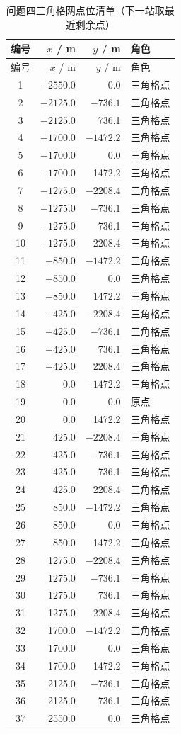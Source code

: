 \documentclass{cumcmthesis}
\begin{document}
{\scriptsize
\begin{longtable}{crrl}
\caption{问题四三角格网点位清单（下一站取最近剩余点）}
\label{tab:q4visit}\\
\toprule
编号 & $x$ / m & $y$ / m & 角色 \\
\midrule
\endfirsthead
\toprule
编号 & $x$ / m & $y$ / m & 角色 \\
\midrule
\endhead
1 & $-2550.0$ & 0.0 & 三角格点 \\
2 & $-2125.0$ & $-736.1$ & 三角格点 \\
3 & $-2125.0$ & 736.1 & 三角格点 \\
4 & $-1700.0$ & $-1472.2$ & 三角格点 \\
5 & $-1700.0$ & 0.0 & 三角格点 \\
6 & $-1700.0$ & 1472.2 & 三角格点 \\
7 & $-1275.0$ & $-2208.4$ & 三角格点 \\
8 & $-1275.0$ & $-736.1$ & 三角格点 \\
9 & $-1275.0$ & 736.1 & 三角格点 \\
10 & $-1275.0$ & 2208.4 & 三角格点 \\
11 & $-850.0$ & $-1472.2$ & 三角格点 \\
12 & $-850.0$ & 0.0 & 三角格点 \\
13 & $-850.0$ & 1472.2 & 三角格点 \\
14 & $-425.0$ & $-2208.4$ & 三角格点 \\
15 & $-425.0$ & $-736.1$ & 三角格点 \\
16 & $-425.0$ & 736.1 & 三角格点 \\
17 & $-425.0$ & 2208.4 & 三角格点 \\
18 & 0.0 & $-1472.2$ & 三角格点 \\
19 & 0.0 & 0.0 & 原点 \\
20 & 0.0 & 1472.2 & 三角格点 \\
21 & 425.0 & $-2208.4$ & 三角格点 \\
22 & 425.0 & $-736.1$ & 三角格点 \\
23 & 425.0 & 736.1 & 三角格点 \\
24 & 425.0 & 2208.4 & 三角格点 \\
25 & 850.0 & $-1472.2$ & 三角格点 \\
26 & 850.0 & 0.0 & 三角格点 \\
27 & 850.0 & 1472.2 & 三角格点 \\
28 & 1275.0 & $-2208.4$ & 三角格点 \\
29 & 1275.0 & $-736.1$ & 三角格点 \\
30 & 1275.0 & 736.1 & 三角格点 \\
31 & 1275.0 & 2208.4 & 三角格点 \\
32 & 1700.0 & $-1472.2$ & 三角格点 \\
33 & 1700.0 & 0.0 & 三角格点 \\
34 & 1700.0 & 1472.2 & 三角格点 \\
35 & 2125.0 & $-736.1$ & 三角格点 \\
36 & 2125.0 & 736.1 & 三角格点 \\
37 & 2550.0 & 0.0 & 三角格点 \\
\bottomrule
\end{longtable}
}
\end{document}
